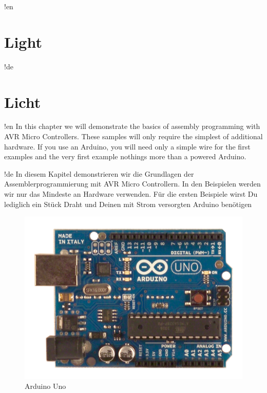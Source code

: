 \documentclass[twoside,12pt,authoryear,openright]{book}
\begin{document}
!en \chapter{Light}
!de \chapter{Licht}

!en In this chapter we will demonstrate the basics of assembly programming with AVR Micro Controllers. These samples will only require the simplest of additional hardware. If you use an Arduino, you will need only a simple wire for the first examples and the very first example nothings more than a powered Arduino.

!de In diesem Kapitel demonstrieren wir die Grundlagen der Assemblerprogrammierung mit AVR Micro Controllern. In den Beispielen werden wir nur das Mindeste an Hardware verwenden. Für die ersten Beispiele wirst Du lediglich ein Stück Draht und Deinen mit Strom versorgten Arduino benötigen

\begin{figure}[htbp]
  \centering
  \includegraphics[width=120mm]{Media/www-arduino-cc_ArduinoUnoFront.jpeg}
  \caption{Arduino Uno}
  \label{ArduinoUnoFront}
\end{figure}
\end{document}
